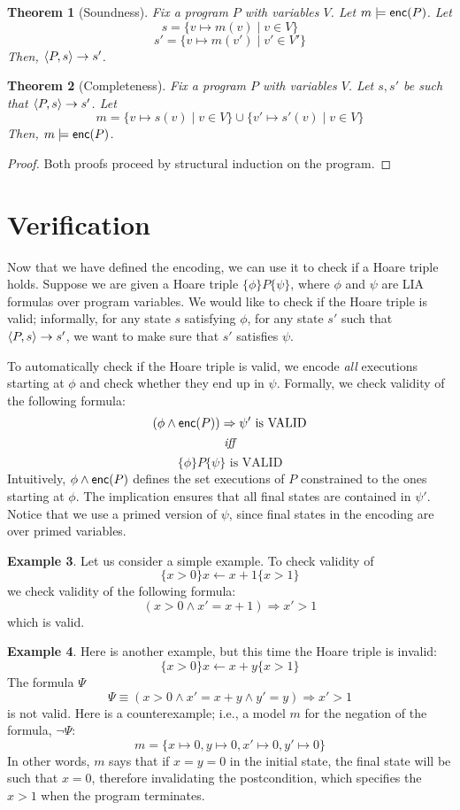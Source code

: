 \documentclass{amsart}
\newtheorem{theorem}{Theorem}[section]
\theoremstyle{definition}
\newtheorem{example}[theorem]{Example}
\theoremstyle{remark}
\numberwithin{equation}{section}
\begin{document}
\begin{theorem}[Soundness]
  Fix a program $P$ with variables $V$.
  Let $m \models \mathsf{enc}(P)$.
  Let $$s = \{v \mapsto m(v) \mid v \in V\}$$
  $$s' = \{v \mapsto m(v') \mid v' \in V'\}$$
  Then, $\langle P,s \rangle \to s'$.
\end{theorem}

\begin{theorem}[Completeness]
  Fix a program $P$ with variables $V$.
  Let $s,s'$ be such that
  $\langle P,s \rangle \to s'$.
  Let
  $$m = \{v\mapsto s(v) \mid v \in V\} \cup \{v'\mapsto s'(v) \mid v \in V\}$$
  Then, $m \models \mathsf{enc}(P)$.
\end{theorem}

\begin{proof}
  Both proofs proceed by structural induction
  on the program.
\end{proof}

\section{Verification}
Now that we have defined the encoding,
we can use it to check if a Hoare triple
holds.
Suppose we are given a Hoare triple
$\{\phi\} P \{\psi\}$,
where $\phi$ and $\psi$ are LIA formulas
over program variables.
We would like to check if the Hoare triple is valid;
informally, for any state $s$ satisfying $\phi$,
for any state $s'$ such that $\langle P,s \rangle \to s'$,
we want to make sure that $s'$ satisfies $\psi$.

To automatically check if the Hoare triple
is valid, we encode \emph{all} executions starting at
$\phi$ and check whether they end up in $\psi$.
Formally, we check validity of the following formula:
$$ (\phi \land \mathsf{enc}(P)) \Rightarrow \psi' \text{ is VALID}$$
$$\emph{iff}$$
$$\{\phi\} P \{\psi\} \text{ is VALID}$$
Intuitively, $\phi \land \mathsf{enc}(P)$ defines
the set executions of $P$ constrained to the ones
starting at $\phi$. The implication ensures
that all final states are contained in $\psi'$.
Notice that we use a primed version of $\psi$,
since final states in the encoding are over primed variables.

\begin{example}
  Let us consider a simple example.
  To check validity of
  $$\{x > 0\} x \gets x + 1 \{x > 1\}$$
  we check validity of the following formula:
  $$(x > 0 \land x' = x + 1) \Rightarrow x' > 1$$
  which is valid.
\end{example}

\begin{example}
  Here is another example, but this time the Hoare triple
  is invalid:
  $$\{x > 0\} x \gets x + y \{x > 1\}$$
  The formula $\Psi$
    $$\Psi \equiv (x > 0 \land x' = x + y \land y'=y) \Rightarrow x' > 1$$
    is not valid.
    Here is a counterexample; i.e., a model $m$ for the negation
    of the formula, $\neg\Psi$:
    $$m = \{x \mapsto 0, y \mapsto 0, x' \mapsto 0, y' \mapsto 0\}$$
    In other words, $m$ says that if $x = y = 0$
    in the initial state, the final state will be such that
    $x = 0$, therefore invalidating the postcondition,
    which specifies the $x > 1$ when the program terminates.
\end{example}
\end{document}
